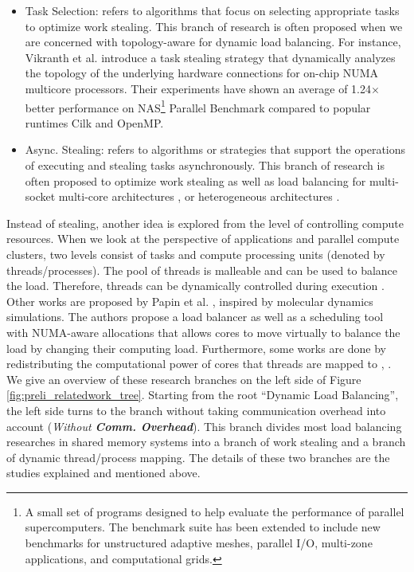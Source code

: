 \begin{itemize}
	\item Task Selection: refers to algorithms that focus on selecting appropriate tasks to optimize work stealing. This branch of research is often proposed when we are concerned with topology-aware for dynamic load balancing. For instance, Vikranth et al. \cite{vikranth2013topoawarews} introduce a task stealing strategy that dynamically analyzes the topology of the underlying hardware connections for on-chip NUMA multicore processors. Their experiments have shown an average of 1.24$\times$ better performance on NAS\footnote{A small set of programs designed to help evaluate the performance of parallel supercomputers. The benchmark suite has been extended to include new benchmarks for unstructured adaptive meshes, parallel I/O, multi-zone applications, and computational grids.} Parallel Benchmark \cite{nas3benchmark} compared to popular runtimes Cilk and OpenMP.
	
	\item Async. Stealing: refers to algorithms or strategies that support the operations of executing and stealing tasks asynchronously. This branch of research is often proposed to optimize work stealing as well as load balancing for multi-socket multi-core architectures \cite{chen2014laws}, or heterogeneous architectures \cite{kumar2015hetews}.
\end{itemize}
	
Instead of stealing, another idea is explored from the level of controlling compute resources. When we look at the perspective of applications and parallel compute clusters, two levels consist of tasks and compute processing units (denoted by threads/processes). The pool of threads is malleable and can be used to balance the load. Therefore, threads can be dynamically controlled during execution \cite{garcia2009lewi} \cite{hofmeyr2010load}. Other works are proposed by Papin et al. \cite{papin2014dlbpairpot} \cite{papin2021spawn}, inspired by molecular dynamics simulations. The authors propose a load balancer as well as a scheduling tool with NUMA-aware allocations that allows cores to move virtually to balance the load by changing their computing load. Furthermore, some works are done by redistributing the computational power of cores that threads are mapped to \cite{spiegel2006hybrid}, \cite{duran2005automatic}.\\

We give an overview of these research branches on the left side of Figure \ref{fig:preli_relatedwork_tree}. Starting from the root ``Dynamic Load Balancing'', the left side turns to the branch without taking communication overhead into account (\textit{Without \textbf{Comm. Overhead}}). This branch divides most load balancing researches in shared memory systems into a branch of work stealing and a branch of dynamic thread/process mapping. The details of these two branches are the studies explained and mentioned above.\\

